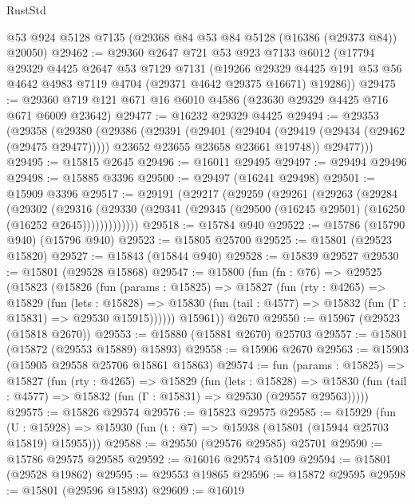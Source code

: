 \begin{lexlean}{RustStd}
\begin{coremodule}
    @53
    @924
    @5128
    @7135
    (@29368 @84 @53 @84 @5128 (@16386 (@29373 @84)) @20050)
@29462 := @29360
    @2647
    @721
    @53
    @923
    @7133
    @6012
    (@17794
      @29329
      @4425
      @2647
      @53
      @7129
      @7131
      (@19266
        @29329
        @4425
        @191
        @53
        @56
        @4642
        @4983
        @7119
        @4704
        (@29371 @4642 @29375 @16671)
        @19286))
@29475 := @29360 @719 @121 @671 @16 @6010 @4586 (@23630 @29329 @4425 @716 @671 @6009 @23642)
@29477 := @16232 @29329 @4425
@29494 := @29353
    (@29358
      (@29380
        (@29386
          (@29391
            (@29401
              (@29404 (@29419 (@29434 (@29462 (@29475 @29477)))))
              @23652
              @23655
              @23658
              @23661
              @19748))
          @29477)))
@29495 := @15815 @2645
@29496 := @16011 @29495
@29497 := @29494 @29496
@29498 := @15885 @3396
@29500 := @29497 (@16241 @29498)
@29501 := @15909 @3396
@29517 := @29191
    (@29217
      (@29259
        (@29261
          (@29263
            (@29284
              (@29302
                (@29316
                  (@29330 (@29341 (@29345 (@29500 (@16245 @29501) (@16250 (@16252 @2645)))))))))))))
@29518 := @15784 @940
@29522 := @15786 (@15790 @940) (@15796 @940)
@29523 := @15805 @25700
@29525 := @15801 (@29523 @15820)
@29527 := @15843 (@15844 @940)
@29528 := @15839 @29527
@29530 := @15801 (@29528 @15868)
@29547 := @15800
    (fun (fn : @76) =>
    @29525
      (@15823
        (@15826
          (fun (params : @15825) =>
          @15827
            (fun (rty : @4265) =>
            @15829
              (fun (lets : @15828) =>
              @15830 (fun (tail : @4577) => @15832 (fun (Γ : @15831) => @29530 @15915))))))
        @15961))
    @2670
@29550 := @15967 (@29523 (@15818 @2670))
@29553 := @15880 (@15881 @2670) @25703
@29557 := @15801 (@15872 (@29553 @15889) @15893)
@29558 := @15906 @2670
@29563 := @15903 (@15905 @29558 @25706 @15861 @15863)
@29574 := fun (params : @15825) =>
  @15827
    (fun (rty : @4265) =>
    @15829
      (fun (lets : @15828) =>
      @15830 (fun (tail : @4577) => @15832 (fun (Γ : @15831) => @29530 (@29557 @29563)))))
@29575 := @15826 @29574
@29576 := @15823 @29575
@29585 := @15929
    (fun (U : @15928) => @15930 (fun (t : @7) => @15938 (@15801 (@15944 @25703 @15819) @15955)))
@29588 := @29550 (@29576 @29585) @25701
@29590 := @15786 @29575 @29585
@29592 := @16016 @29574 @5109
@29594 := @15801 (@29528 @19862)
@29595 := @29553 @19865
@29596 := @15872 @29595
@29598 := @15801 (@29596 @15893)
@29609 := @16019

\end{coremodule}
\end{lexlean}
